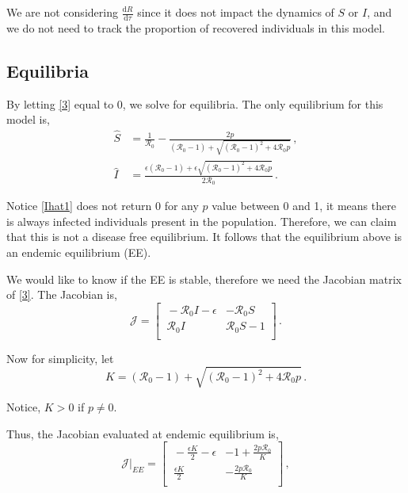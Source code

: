 \documentclass[12pt]{article}
\newcommand\dbyd[2]{\frac{\mathrm d{#1}}{\mathrm d{#2}}}
\newcommand{\R}{\mathcal{R}}
\begin{document}
We are not considering $\dbyd{R}{\tau}$ since it does not impact the dynamics of $S$ or $I$, and we do not need to track the proportion of recovered individuals in this model.
\subsection{Equilibria}
By letting \autoref{3} equal to 0, we solve for equilibria. The only equilibrium for this model is,
\begin{subequations}
\begin{align}
\hat{S} &=\frac{1}{\R_0}-\frac{2p}{(\R_0 -1)+ \sqrt{(\R_0-1)^2+4\R_0 p}}\,, \label{Shat1}\\
\hat{I} &= \frac{\epsilon(\R_0 -1)+ \epsilon \sqrt{(\R_0-1)^2+4\R_0
    p}}{2\R_0}\,.\label{Ihat1}
\end{align}
\end{subequations}

Notice \autoref{Ihat1} does not return 0 for any $p$ value between 0 and 1, it means there is always infected individuals present in the population. Therefore, we can claim that this is not a disease free equilibrium. It follows that the equilibrium above is an endemic equilibrium (EE).

We would like to know if the EE is stable, therefore we need the Jacobian matrix of \autoref{3}. The Jacobian is, 
\begin{equation}
\mathcal{J} =
\begin{bmatrix}
    \ -\R_0 I-\epsilon       & -\R_0 S \\
    \ \R_0 I       & \R_0 S-1 \\
\end{bmatrix} \,.
\end{equation}

Now for simplicity, let 
\begin{equation}\label{E:}
K = (\R_0 -1)+ \sqrt{(\R_0-1)^2+4\R_0 p} \,.
\end{equation}

Notice, $K>0$ if $p\neq 0$.

Thus, the Jacobian evaluated at endemic equilibrium is,
\begin{equation}
\mathcal{J}|_{EE} =
\begin{bmatrix}
    \ -\frac{\epsilon K}{2}-\epsilon       & -1+\frac{2p \R_0}{K} \\
    \ \frac{\epsilon K}{2}       & -\frac{2p \R_0}{K} \\
\end{bmatrix} \label{Jacobian1} \,,
\end{equation}
\end{document}
